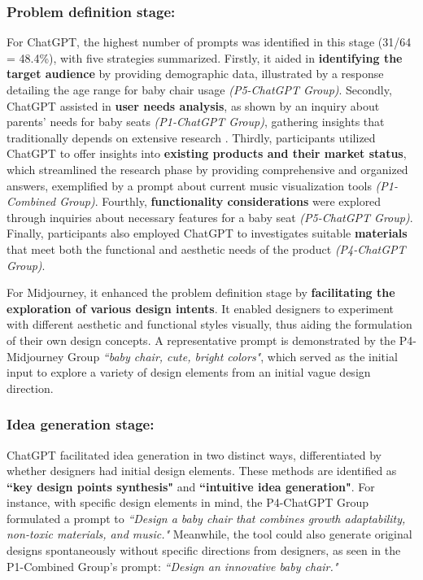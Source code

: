 \documentclass{dsj}
\begin{document}
\subsubsection{Problem definition stage:}
For ChatGPT, the highest number of prompts was identified in this stage (31/64 = 48.4\%), with five strategies summarized. Firstly, it aided in \textbf{identifying the target audience} by providing demographic data, illustrated by a response detailing the age range for baby chair usage \textit{(P5-ChatGPT Group)}. Secondly, ChatGPT assisted in \textbf{user needs analysis}, as shown by an inquiry about parents’ needs for baby seats \textit{(P1-ChatGPT Group)}, gathering insights that traditionally depends on extensive research \citep{french1985conceptual}. Thirdly, participants utilized ChatGPT to offer insights into \textbf{existing products and their market status}, which streamlined the research phase by providing comprehensive and organized answers, exemplified by a prompt about current music visualization tools \textit{(P1-Combined Group)}. Fourthly, \textbf{functionality considerations} were explored through inquiries about necessary features for a baby seat \textit{(P5-ChatGPT Group)}. Finally, participants also employed ChatGPT to investigates suitable \textbf{materials} that meet both the functional and aesthetic needs of the product \textit{(P4-ChatGPT Group)}.

For Midjourney, it enhanced the problem definition stage by \textbf{facilitating the exploration of various design intents}. It enabled designers to experiment with different aesthetic and functional styles visually, thus aiding the formulation of their own design concepts. A representative prompt is demonstrated by the P4-Midjourney Group \textit{``baby chair, cute, bright colors"}, which served as the initial input to explore a variety of design elements from an initial vague design direction.

\subsubsection{Idea generation stage:}
ChatGPT facilitated idea generation in two distinct ways, differentiated by whether designers had initial design elements. These methods are identified as \textbf{``key design points synthesis"} and \textbf{``intuitive idea generation"}. For instance, with specific design elements in mind, the P4-ChatGPT Group formulated a prompt to \textit{``Design a baby chair that combines growth adaptability, non-toxic materials, and music."} Meanwhile, the tool could also generate original designs spontaneously without specific directions from designers, as seen in the P1-Combined Group’s prompt: \textit{``Design an innovative baby chair."}
\end{document}
